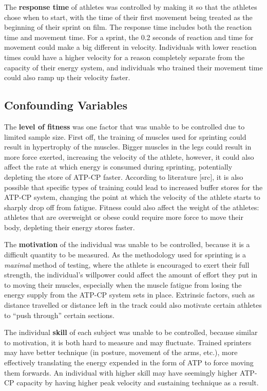 \documentclass[index]{subfiles}
\begin{document}
The \textbf{response time} of athletes was controlled by making it so that the athletes chose when to start, with the time of their first movement being treated as the beginning of their sprint on film. The response time includes both the reaction time and movement time. For a sprint, the 0.2 seconds of reaction and time for movement could make a big different in velocity. Individuals with lower reaction times could have a higher velocity for a reason completely separate from the capacity of their energy system, and individuals who trained their movement time could also ramp up their velocity faster.

\subsection{Confounding Variables}

The \textbf{level of fitness} was one factor that was unable to be controlled due to limited sample size. First off, the training of muscles used for sprinting could result in hypertrophy of the muscles. Bigger muscles in the legs could result in more force exerted, increasing the velocity of the athlete, however, it could also affect the rate at which energy is consumed during sprinting, potentially depleting the store of ATP-CP faster. According to literature [src], it is also possible that specific types of training could lead to increased buffer stores for the ATP-CP system, changing the point at which the velocity of the athlete starts to sharply drop off from fatigue. Fitness could also affect the weight of the athletes: athletes that are overweight or obese could require more force to move their body, depleting their energy stores faster.

The \textbf{motivation} of the individual was unable to be controlled, because it is a difficult quantity to be measured. As the methodology used for sprinting is a \textit{maximal} method of testing, where the athlete is encouraged to exert their full strength, the individual's willpower could affect the amount of effort they put in to moving their muscles, especially when the muscle fatigue from losing the energy supply from the ATP-CP system sets in place. Extrinsic factors, such as distance travelled or distance left in the track could also motivate certain athletes to ``push through'' certain sections.

The individual \textbf{skill} of each subject was unable to be controlled, because similar to motivation, it is both hard to measure and may fluctuate. Trained sprinters may have better technique (in posture, movement of the arms, etc.), more effectively translating the energy expended in the form of ATP to force moving them forwards. An individual with higher skill may have seemingly higher ATP-CP capacity by having higher peak velocity and sustaining technique as a result.
\end{document}
